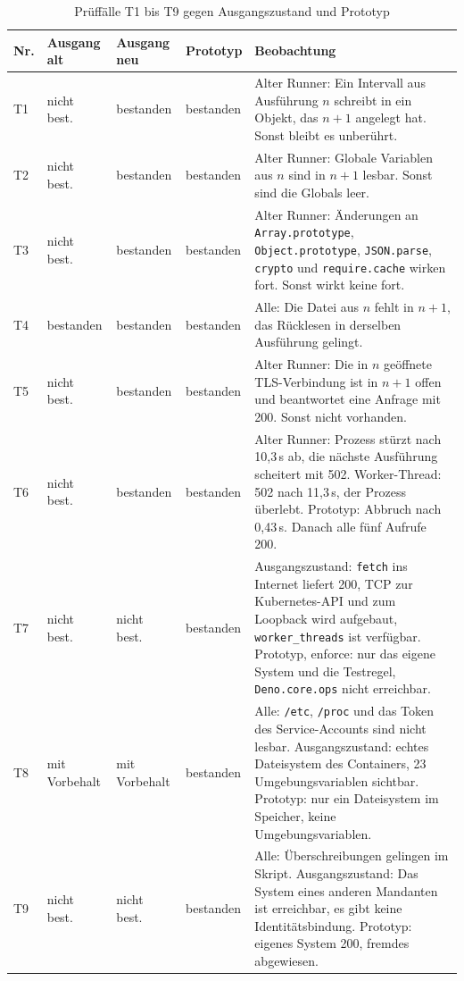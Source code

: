 \begin{table}[tbp]
  \caption{Prüffälle T1 bis T9 gegen Ausgangszustand und Prototyp}
  \label{tab:prueffaelle-ergebnis}
  \footnotesize
  \begin{tabularx}{\textwidth}{@{}l l l l >{\RaggedRight\arraybackslash}X@{}}
    \hline
    Nr. & Ausgang alt & Ausgang neu & Prototyp & Beobachtung \\
    \hline
    T1 & nicht best. & bestanden & bestanden & Alter Runner: Ein Intervall aus Ausführung $n$ schreibt in ein
         Objekt, das $n+1$ angelegt hat. Sonst bleibt es unberührt. \\
    T2 & nicht best. & bestanden & bestanden & Alter Runner: Globale Variablen aus $n$ sind in $n+1$ lesbar. Sonst
         sind die Globals leer. \\
    T3 & nicht best. & bestanden & bestanden & Alter Runner: Änderungen an \texttt{Array.prototype},
         \texttt{Object.prototype}, \texttt{JSON.parse}, \texttt{crypto} und \texttt{require.cache} wirken fort.
         Sonst wirkt keine fort. \\
    T4 & bestanden & bestanden & bestanden & Alle: Die Datei aus $n$ fehlt in $n+1$, das Rücklesen in derselben Ausführung
         gelingt. \\
    T5 & nicht best. & bestanden & bestanden & Alter Runner: Die in $n$ geöffnete \acs{TLS}-Verbindung ist in $n+1$ offen und
         beantwortet eine Anfrage mit 200. Sonst nicht vorhanden. \\
    T6 & nicht best. & bestanden & bestanden & Alter Runner: Prozess stürzt nach 10,3\,s ab, die nächste Ausführung scheitert
         mit 502. Worker-Thread: 502 nach 11,3\,s, der Prozess überlebt. Prototyp: Abbruch nach 0,43\,s. Danach alle fünf
         Aufrufe 200. \\
    T7 & nicht best. & nicht best. & bestanden & Ausgangszustand: \texttt{fetch} ins Internet liefert 200, \acs{TCP} zur
         Kubernetes-\acs{API} und zum Loopback wird aufgebaut, \texttt{worker\_threads} ist verfügbar. Prototyp, enforce: nur
         das eigene System und die Testregel, \texttt{Deno.core.ops} nicht erreichbar. \\
    T8 & mit Vorbehalt & mit Vorbehalt & bestanden & Alle: \texttt{/etc}, \texttt{/proc} und das Token des Service-Accounts sind nicht lesbar.
         Ausgangszustand: echtes Dateisystem des Containers, 23 Umgebungsvariablen sichtbar. Prototyp: nur ein Dateisystem im Speicher, keine Umgebungsvariablen. \\
    T9 & nicht best. & nicht best. & bestanden & Alle: Überschreibungen gelingen im Skript. Ausgangszustand: Das System eines anderen Mandanten
         ist erreichbar, es gibt keine Identitätsbindung. Prototyp: eigenes System 200, fremdes abgewiesen. \\
    \hline
  \end{tabularx}
\end{table}

